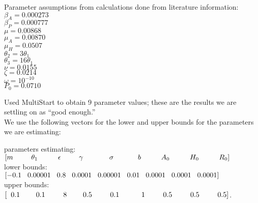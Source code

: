 \documentclass[12pt]{article}
\begin{document}
Parameter assumptions from calculations done from literature information: \\
$\beta_A=0.000273$ \\
$\beta_P=0.000777$ \\
$\mu=0.00868$ \\
$\mu_{A}=0.00870$ \\
$\mu_{H}=0.0507$ \\
$\theta_2=3 \theta_1$ \\
$\theta_3=16\theta_1$ \\
$\nu=0.0155$ \\ 
$\zeta=0.0214$ \\
$\omega=10^{-10}$ \\
$P_0=0.0710$

Used MultiStart to obtain 9 parameter values; these are the results we are settling on as ``good enough.''  \\
We use the following vectors for the lower and upper bounds for the parameters we are estimating: 

parameters estimating: $[m \hspace{0.9cm}   \theta_1 \hspace{1cm}   \epsilon \hspace{0.9cm} \gamma \hspace{1.3cm}  \sigma \hspace{1.2cm}   b \hspace{1cm}    A_0 \hspace{1cm}   H_0  \hspace{1cm}   R_0 ]$ \\
lower bounds:  \hspace{1.2cm} $[-0.1 \hspace{0.3cm}  0.00001 \hspace{0.3cm}    0.8 \hspace{0.3cm}      0.0001  \hspace{0.3cm}        0.00001 \hspace{0.3cm}     0.01 \hspace{0.3cm}     0.0001 \hspace{0.3cm}    0.0001 \hspace{0.3cm}     0.0001  ]$ \\
upper bounds:\hspace{1.2cm} $[\hspace{0.2cm}0.1 \hspace{0.8cm}     0.1  \hspace{0.9cm}        8  \hspace{0.8cm}        0.5  \hspace{0.9cm}           0.1 \hspace{1.1cm}        1  \hspace{0.9cm}        0.5   \hspace{0.9cm}     0.5    \hspace{0.9cm}    0.5     ]$.
\end{document}
